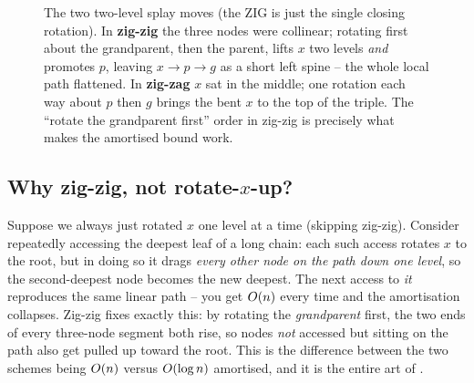\begin{figure}[H]
\centering
{}
\caption{The two two-level splay moves (the ZIG is just the single closing rotation). In \textbf{zig-zig}
the three nodes were collinear; rotating first about the grandparent, then the parent, lifts $x$ two
levels \emph{and} promotes $p$, leaving $x\to p\to g$ as a short left spine -- the whole local path
flattened. In \textbf{zig-zag} $x$ sat in the middle; one rotation each way about $p$ then $g$ brings the
bent $x$ to the top of the triple. The ``rotate the grandparent first'' order in zig-zig is precisely what
makes the amortised bound work.}\label{fig:c06-splayfig}
\end{figure}

\subsection{Why zig-zig, not rotate-$x$-up?}

Suppose we always just rotated $x$ one level at a time (skipping zig-zig). Consider repeatedly accessing
the deepest leaf of a long chain: each such access rotates $x$ to the root, but in doing so it drags
\emph{every other node on the path down one level}, so the second-deepest node becomes the new deepest.
The next access to \emph{it} reproduces the same linear path -- you get $O(n)$ every time and the
amortisation collapses. Zig-zig fixes exactly this: by rotating the \emph{grandparent} first, the two ends
of every three-node segment both rise, so nodes \emph{not} accessed but sitting on the path also get pulled
up toward the root. This is the difference between the two schemes being $O(n)$ versus $O(\log n)$
amortised, and it is the entire art of .

